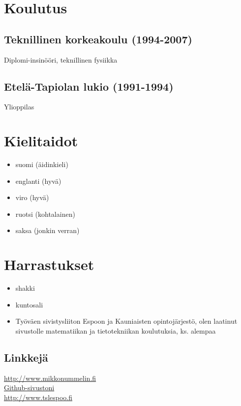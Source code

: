 \documentclass[a4paper,12pt]{article}
\begin{document}
\section*{Koulutus}
\subsection*{Teknillinen korkeakoulu (1994-2007)}
Diplomi-insinööri, teknillinen fysiikka
\subsection*{Etelä-Tapiolan lukio (1991-1994)}
Ylioppilas
\section*{Kielitaidot}
\begin{itemize}
\item{suomi (äidinkieli)}
\item{englanti (hyvä)}
\item{viro (hyvä)}
\item{ruotsi (kohtalainen)}
\item{saksa (jonkin verran)}
\end{itemize}
\section*{Harrastukset}
\begin{itemize}
\item{shakki}
\item{kuntosali}
\item{Työväen sivistysliiton Espoon ja Kauniaisten opintojärjestö, olen laatinut sivustolle matematiikan ja tietotekniikan koulutuksia, ks. alempaa}
\end{itemize}
\subsection*{Linkkejä}
\href{http://www.mikkonummelin.fi}{http://www.mikkonummelin.fi} \\
\href{http://github.com/mnummeli}{Github-sivustoni} \\
\href{http://www.tslespoo.fi}{http://www.tslespoo.fi}
\end{document}
